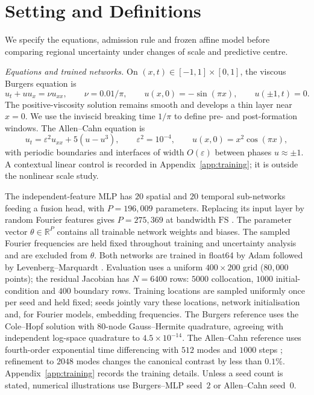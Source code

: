 \section{Setting and Definitions}\label{sec:setting}

We specify the equations, admission rule and frozen affine model before comparing
regional uncertainty under changes of scale and predictive centre.

\emph{Equations and trained networks.}
On $(x,t)\in[-1,1]\times[0,1]$, the viscous Burgers equation is
\[
 u_t+u u_x=\nu u_{xx},\qquad \nu=0.01/\pi,\qquad
 u(x,0)=-\sin(\pi x),\qquad u(\pm1,t)=0.
\]
The positive-viscosity solution remains smooth and develops a thin layer near $x=0$.
We use the inviscid breaking time $1/\pi$ to define pre- and post-formation windows.
The Allen--Cahn equation is
\[
 u_t=\varepsilon^2u_{xx}+5(u-u^3),\qquad \varepsilon^2=10^{-4},\qquad
 u(x,0)=x^2\cos(\pi x),
\]
with periodic boundaries and interfaces of width $O(\varepsilon)$ between phases
$u\approx\pm1$. A contextual linear control is recorded in Appendix~\ref{app:training};
it is outside the nonlinear scale study.

The independent-feature MLP has $20$ spatial and $20$ temporal sub-networks feeding
a fusion head, with $P=196{,}009$ parameters. Replacing its input layer by random
Fourier features gives $P=275{,}369$ at bandwidth $\mathrm{FS}$
\citep{tancik2020fourier}. The parameter vector $\theta\in\mathbb R^P$ contains
all trainable network weights and biases. The sampled Fourier frequencies are
held fixed throughout training and uncertainty analysis and are excluded from
$\theta$. Both networks are trained in float64 by Adam
\citep{kingma2015adam} followed by Levenberg--Marquardt
\citep{levenberg1944,marquardt1963}. Evaluation uses a uniform $400\times200$ grid ($80{,}000$
points); the residual Jacobian has $N=6400$ rows: $5000$ collocation, $1000$
initial-condition and $400$ boundary rows. Training locations are sampled uniformly
once per seed and held fixed; seeds jointly vary these locations, network
initialisation and, for Fourier models, embedding frequencies. The Burgers reference uses the Cole--Hopf
solution with $80$-node Gauss--Hermite quadrature, agreeing with independent
log-space quadrature to $4.5\times10^{-14}$. The Allen--Cahn reference uses
fourth-order exponential time differencing with $512$ modes and $1000$ steps
\citep{kassam2005etdrk4}; refinement to $2048$ modes changes the canonical contrast
by less than $0.1\%$. Appendix~\ref{app:training} records the training details.
Unless a seed count is stated, numerical illustrations use Burgers--MLP seed~$2$
or Allen--Cahn seed~$0$.


